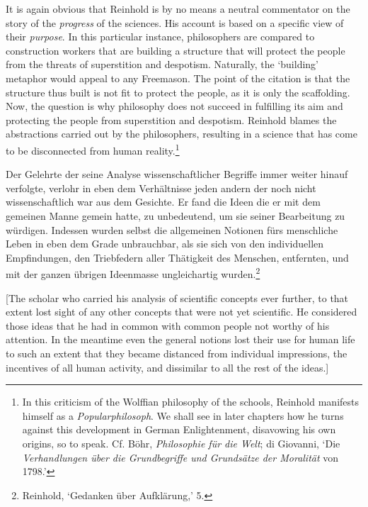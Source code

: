 It is again obvious that Reinhold is by no means a neutral commentator on the story of the \textit{progress} of the sciences. His account is based on a specific view of their \textit{purpose}. In this particular instance, philosophers are compared to construction workers that are building a structure that will protect the people from the threats of superstition and despotism. Naturally, the `building' metaphor would appeal to any Freemason. The point of the citation is that the structure thus built is not fit to protect the people, as it is only the scaffolding. Now, the question is why philosophy does not succeed in fulfilling its aim and protecting the people from superstition and despotism. Reinhold blames the abstractions carried out by the philosophers, resulting in a science that has come to be disconnected from human reality.\footnote{ In this criticism of the Wolffian philosophy of the schools, Reinhold manifests himself as a \textit{Popularphilosoph}. We shall see in later chapters how he turns against this development in German Enlightenment, disavowing his own origins, so to speak. Cf. B\"{o}hr, \textit{Philosophie f\"{u}r die Welt}; di Giovanni, `Die \textit{Verhandlungen \"{u}ber die Grundbegriffe und Grunds\"{a}tze der Moralit\"{a}t} von 1798.'} 

Der Gelehrte der seine Analyse wissenschaftlicher Begriffe immer weiter hinauf verfolgte, verlohr in eben dem Verh\"{a}ltnisse jeden andern der noch nicht wissenschaftlich war aus dem Gesichte. Er fand die Ideen die er mit dem gemeinen Manne gemein hatte, zu unbedeutend, um sie seiner Bearbeitung zu w\"{u}rdigen. Indessen wurden selbst die allgemeinen Notionen f\"{u}rs menschliche Leben in eben dem Grade unbrauchbar, als sie sich von den individuellen Empfindungen, den Triebfedern aller Th\"{a}tigkeit des Menschen, entfernten, und mit der ganzen \"{u}brigen Ideenmasse ungleichartig wurden.\footnote{ Reinhold, `Gedanken \"{u}ber Aufkl\"{a}rung,' 5. } 

[The scholar who carried his analysis of scientific concepts ever further, to that extent lost sight of any other concepts that were not yet scientific. He considered those ideas that he had in common with common people not worthy of his attention. In the meantime even the general notions lost their use for human life to such an extent that they became distanced from individual impressions, the incentives of all human activity, and dissimilar to all the rest of the ideas.]

